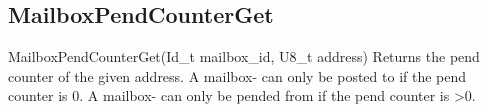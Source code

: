 \subsection{MailboxPendCounterGet}
\label{func:MailboxPendCounterGet}
\begin{pdfunction}
{MailboxPendCounterGet(Id\_t mailbox\_id, U8\_t address) }
{ 
Returns the pend counter of the given address. A mailbox- 
can only be posted to if the pend counter is 0. A mailbox- 
can only be pended from if the pend counter is >0. }
\end{pdfunction}
